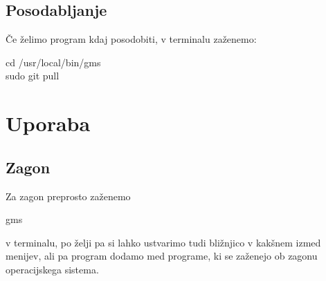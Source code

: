 \documentclass[10pt,a4paper,oneside]{book}
\newcommand\inline[1]{%
\begin{Sbox}{#1}\end{Sbox}%
\colorbox{lightgray}{\TheSbox}%
}
\newcommand\inliney[1]{%
\begin{Sbox}\begin{varwidth}{0.91\textwidth}{#1}\end{varwidth}\end{Sbox}%
\colorbox{lightgray}{\TheSbox}%
}
\begin{document}
\subsection{Posodabljanje}
Če želimo program kdaj posodobiti, v terminalu zaženemo:\\
\inliney{cd /usr/local/bin/gms\\
sudo git pull}
\section{Uporaba}
\subsection{Zagon}
Za zagon preprosto zaženemo \inline{gms} v terminalu, po želji pa si lahko ustvarimo tudi bližnjico v kakšnem izmed menijev, ali pa program dodamo med programe, ki se zaženejo ob zagonu operacijskega sistema.
\end{document}
